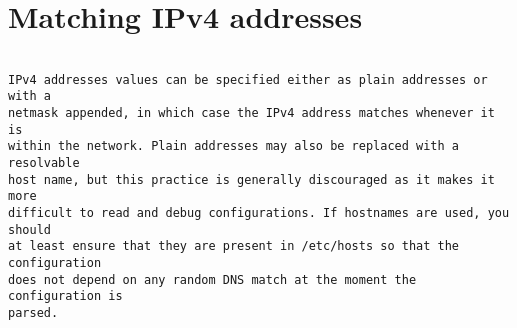 
\section{Matching IPv4 addresses}

\begin{verbatim}

IPv4 addresses values can be specified either as plain addresses or with a
netmask appended, in which case the IPv4 address matches whenever it is
within the network. Plain addresses may also be replaced with a resolvable
host name, but this practice is generally discouraged as it makes it more
difficult to read and debug configurations. If hostnames are used, you should
at least ensure that they are present in /etc/hosts so that the configuration
does not depend on any random DNS match at the moment the configuration is
parsed.


\end{verbatim}
